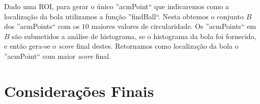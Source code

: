 \documentclass[11pt,a4paper]{article}
\begin{document}
 Dado uma ROI, para gerar o único ''acmPoint`` que indicaremos como a localização da bola utilizamos a função ''findBall``. Nesta obtemos o conjunto $B$ dos ''acmPoints`` com os $10$ maiores valores de circularidade. Os ''acmPoints`` em $B$ são submetidos a análise de histograma, se o histograma da bola foi fornecido, e então gera-se o \textit{score} final destes. Retornamos como localização da bola o ''acmPoint`` com maior \textit{score} final.


\section{Considerações Finais}


\begin{thebibliography}{99}



\end{thebibliography}
\end{document}
